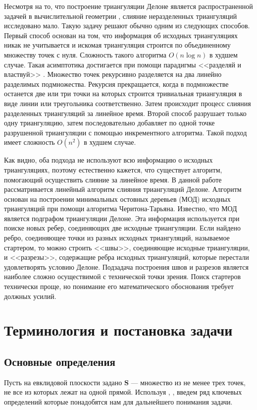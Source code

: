 \documentclass[12pt]{article}
\begin{document}
Несмотря на то, что построение триангуляции Делоне является распространенной задачей в вычислительной геометрии \cite{Skvortsov},
слияние неразделенных триангуляций исследовано мало.
Такую задачу решают обычно одним из следующих способов.
Первый способ основан на том, что информация об исходных триангуляциях никак не учитывается и искомая триангуляция строится
по объединенному множеству точек с нуля. Сложность такого алгоритма $O(n\log n)$ в худшем случае.
Такая асимптотика достигается при помощи парадигмы <<разделяй и властвуй>> \cite[стр. 44-45]{Skvortsov}.
Множество точек рекурсивно разделяется на два линейно разделимых подмножества.
Рекурсия прекращается, когда в подмножестве останется две или три точки
на которых строится тривиальная триангуляция в виде линии или треугольника соответственно.
Затем происходит процесс слияния разделенных триангуляций за линейное время.
Второй способ разрушает только одну триангуляцию,
затем последовательно добавляет по одной точке разрушенной триангуляции с помощью инкрементного алгоритма.
Такой подход имеет сложность $O(n^2)$ в худшем случае.

Как видно, оба подхода не используют всю информацию о исходных триангуляциях,
поэтому естественно кажется, что существует алгоритм, помогающий осуществить слияние за линейное время.
В данной работе рассматривается линейный алгоритм слияния триангуляций Делоне.
Алгоритм основан на построении минимальных остовных деревьев (МОД) исходных триангуляций
при помощи алгоритма Черитона-Тарьяна.
Известно, что МОД является подграфом триангуляции Делоне.
Эта информация используется при поиске новых ребер, соединяющих две исходные триангуляции.
Если найдено ребро, соединяющее точки из разных исходных триангуляций, называемое стартером,
то можно строить <<швы>>, соединяющие исходные триангуляции,
и <<разрезы>>, содержащие ребра исходных триангуляций, которые перестали удовлетворять условию Делоне.
Подзадача построения швов и разрезов является наиболее сложно осуществимой с технической точки зрения.
Поиск стартеров технически проще, но понимание его математического обоснования
требует должных усилий.

\section{Терминология и постановка задачи}

\subsection{Основные определения}
Пусть на евклидовой плоскости задано $\textbf{S}$ --- множество из не менее трех точек, не все из которых лежат на одной прямой.
Используя \cite[стр.~7-8]{Skvortsov}, \cite{MestOverlap}, введем ряд ключевых определений которые понадобятся нам для дальнейшего понимания задачи.
\end{document}
